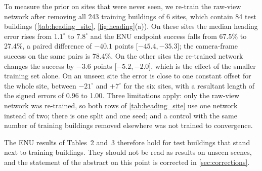 \documentclass[10pt,twocolumn,letterpaper]{article}
\newcommand{\ci}[2]{{\scriptsize[\ensuremath{#1},\,\ensuremath{#2}]}}
\begin{document}
To measure the prior on sites that were never seen, we re-train the raw-view network after removing all 243 training buildings of 6 sites, which contain 84 test buildings (\cref{tab:heading_site}, \cref{fig:heading}(a)). On these sites the median heading error rises from $1.1^\circ$ to $7.8^\circ$ and the ENU endpoint success falls from 67.5\% to 27.4\%, a paired difference of \ensuremath{-40.1}{} points \ci{\ensuremath{-45.4}}{\ensuremath{-35.3}}; the camera-frame success on the same pairs is 78.4\%. On the other sites the re-trained network changes the success by \ensuremath{-3.6}{} points \ci{\ensuremath{-5.2}}{\ensuremath{-2.0}}, which is the effect of the smaller training set alone. On an unseen site the error is close to one constant offset for the whole site, between $\ensuremath{-21}^\circ$ and $\ensuremath{+7}^\circ$ for the six sites, with a resultant length of the signed errors of 0.96 to 1.00. Three limitations apply: only the raw-view network was re-trained, so both rows of \cref{tab:heading_site} use one network instead of two; there is one split and one seed; and a control with the same number of training buildings removed elsewhere was not trained to convergence.

The ENU results of Tables~2 and~3 therefore hold for test buildings that stand next to training buildings. They should not be read as results on unseen scenes, and the statement of the abstract on this point is corrected in \cref{sec:corrections}.
\end{document}
